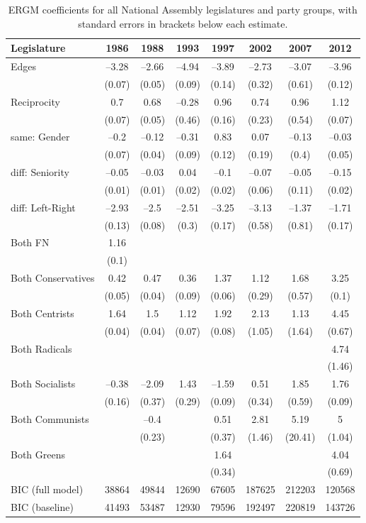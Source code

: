 \begin{table}[ht]
\centering
\begin{tabular}{lccccccc}
  \hline
Legislature & 1986 & 1988 & 1993 & 1997 & 2002 & 2007 & 2012 \\ 
  \hline
Edges & –3.28 & –2.66 & –4.94 & –3.89 & –2.73 & –3.07 & –3.96 \\ 
   & (0.07) & (0.05) & (0.09) & (0.14) & (0.32) & (0.61) & (0.12) \\ 
  Reciprocity & 0.7 & 0.68 & –0.28 & 0.96 & 0.74 & 0.96 & 1.12 \\ 
   & (0.07) & (0.05) & (0.46) & (0.16) & (0.23) & (0.54) & (0.07) \\ 
  same: Gender & –0.2 & –0.12 & –0.31 & 0.83 & 0.07 & –0.13 & –0.03 \\ 
   & (0.07) & (0.04) & (0.09) & (0.12) & (0.19) & (0.4) & (0.05) \\ 
  diff: Seniority & –0.05 & –0.03 & 0.04 & –0.1 & –0.07 & –0.05 & –0.15 \\ 
   & (0.01) & (0.01) & (0.02) & (0.02) & (0.06) & (0.11) & (0.02) \\ 
  diff: Left-Right & –2.93 & –2.5 & –2.51 & –3.25 & –3.13 & –1.37 & –1.71 \\ 
   & (0.13) & (0.08) & (0.3) & (0.17) & (0.58) & (0.81) & (0.17) \\ 
  Both FN & 1.16 &  &  &  &  &  &  \\ 
   & (0.1) &  &  &  &  &  &  \\ 
  Both Conservatives & 0.42 & 0.47 & 0.36 & 1.37 & 1.12 & 1.68 & 3.25 \\ 
   & (0.05) & (0.04) & (0.09) & (0.06) & (0.29) & (0.57) & (0.1) \\ 
  Both Centrists & 1.64 & 1.5 & 1.12 & 1.92 & 2.13 & 1.13 & 4.45 \\ 
   & (0.04) & (0.04) & (0.07) & (0.08) & (1.05) & (1.64) & (0.67) \\ 
  Both Radicals &  &  &  &  &  &  & 4.74 \\ 
   &  &  &  &  &  &  & (1.46) \\ 
  Both Socialists & –0.38 & –2.09 & 1.43 & –1.59 & 0.51 & 1.85 & 1.76 \\ 
   & (0.16) & (0.37) & (0.29) & (0.09) & (0.34) & (0.59) & (0.09) \\ 
  Both Communists &  & –0.4 &  & 0.51 & 2.81 & 5.19 & 5 \\ 
   &  & (0.23) &  & (0.37) & (1.46) & (20.41) & (1.04) \\ 
  Both Greens &  &  &  & 1.64 &  &  & 4.04 \\ 
   &  &  &  & (0.34) &  &  & (0.69) \\ 
   \hline
BIC (full model) & 38864 & 49844 & 12690 & 67605 & 187625 & 212203 & 120568 \\ 
  BIC (baseline) & 41493 & 53487 & 12930 & 79596 & 192497 & 220819 & 143726 \\ 
   \hline
\end{tabular}
\caption{ERGM coefficients for all National Assembly legislatures and party groups, with standard errors in brackets below each estimate.} 
\label{tbl:ergm_an}
\end{table}
